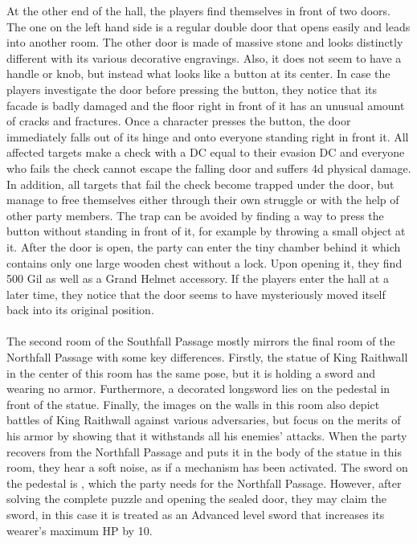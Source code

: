 %
\ofpar
%
At the other end of the hall, the players find themselves in front of two doors.
The one on the left hand side is a regular double door that opens easily and leads into another room.
The other door is made of massive stone and looks distinctly different with its various decorative engravings.
Also, it does not seem to have a handle or knob, but instead what looks like a button at its center.
In case the players investigate the door before pressing the button, they notice that its facade is badly damaged and the floor right in front of it has an unusual amount of cracks and fractures.
Once a character presses the button, the door immediately falls out of its hinge and onto everyone standing right in front it.
All affected targets make a check with a DC equal to their evasion DC and everyone who fails the check cannot escape the falling door and suffers 4d physical damage.
In addition, all targets that fail the check become trapped under the door, but manage to free themselves either through their own struggle or with the help of other party members.
The trap can be avoided by finding a way to press the button without standing in front of it, for example by throwing a small object at it.
After the door is open, the party can enter the tiny chamber behind it which contains only one large wooden chest without a lock.
Upon opening it, they find 500 Gil as well as a Grand Helmet accessory.
If the players enter the hall at a later time, they notice that the door seems to have mysteriously moved itself back into its original position. 
%
\ofpar
%
\\\\
%
The second room of the Southfall Passage mostly mirrors the final room of the Northfall Passage with some key differences.
Firstly, the statue of King Raithwall in the center of this room has the same pose, but it is holding a sword and wearing no armor.
Furthermore, a decorated longsword lies on the pedestal in front of the statue.
Finally, the images on the walls in this room also depict battles of King Raithwall against various adversaries, but focus on the merits of his armor by showing that it withstands all his enemies' attacks.
When the party recovers  from the Northfall Passage and puts it in the body of the statue in this room, they hear a soft noise, as if a mechanism has been activated.
The sword on the pedestal is , which the party needs for the Northfall Passage.
However, after solving the complete puzzle and opening the sealed door, they may claim the sword, in this case it is treated as an Advanced level sword that increases its wearer's maximum HP by 10.
